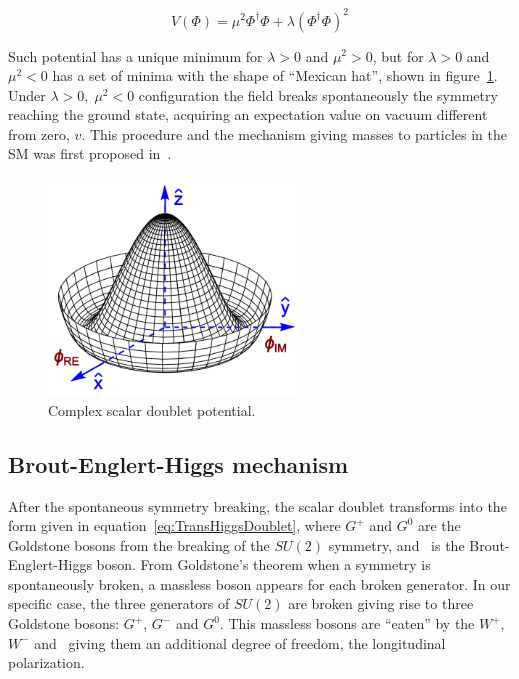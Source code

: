 \begin{equation}
  \label{eq:HiggsPotential}
  V(\Phi)=\mu^{2}\Phi^{\dagger}\Phi+\lambda(\Phi^{\dagger}\Phi)^{2}
\end{equation}

Such potential has a unique minimum for $\lambda>0$ and $\mu^{2}>0$, but for $\lambda>0$ and $\mu^{2}<0$ has a set of minima with the shape of ``Mexican hat'', shown in figure~\ref{fig:MexicanHat}. Under $\lambda>0,\;\mu^{2}<0$ configuration the field breaks spontaneously the symmetry reaching the ground state, acquiring an expectation value on vacuum different from zero, $v$. This procedure and the mechanism giving masses to particles in the SM was first proposed in~\cite{PhysRevLett.13.321, PhysRevLett.13.508}.

\begin{figure}[!Hhtbp]
  \begin{center}
    \includegraphics[width=0.6\textwidth]{figs/Mexican_hat.png}
    \caption{Complex scalar doublet potential.}
    \label{fig:MexicanHat}
  \end{center}
\end{figure}

\subsection{Brout-Englert-Higgs mechanism}
\label{sec:higgs}

After the spontaneous symmetry breaking, the scalar doublet transforms into the form given in equation~\ref{eq:TransHiggsDoublet}, where $G^{+}$ and $G^{0}$ are the Goldstone bosons from the breaking of the $SU(2)$ symmetry, and \Hb~is the Brout-Englert-Higgs boson. From Goldstone's theorem when a symmetry is spontaneously broken, a massless boson appears for each broken generator. In our specific case, the three generators of $SU(2)$ are broken giving rise to three Goldstone bosons: $G^{+}$, $G^{-}$ and $G^{0}$. This massless bosons are ``eaten'' by the $W^{+}$, $W^{-}$ and \Z~giving them an additional degree of freedom, the longitudinal polarization. 

